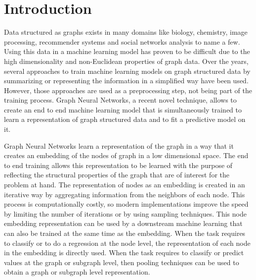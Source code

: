 \newpage
\section{Introduction}


Data structured as graphs exists in many domains like biology, chemistry, image processing, recommender systems and social networks analysis to name a few. Using this data in a machine learning model has proven to be difficult due to the high dimensionality and non-Euclidean properties of graph data. Over the years, several approaches to train machine learning models on graph structured data by summarizing or representing the information in a simplified way have been used. However, those approaches are used as a preprocessing step, not being part of the training process. Graph Neural Networks, a recent novel technique, allows to create an end to end machine learning model that is simultaneously trained to learn a representation of graph structured data and to fit a predictive model on it. 


Graph Neural Networks \cite{scarcelli} learn a representation of the graph in a way that it creates an embedding of the nodes of graph in a low dimensional space. The end to end training allows this representation to be learned with the purpose of reflecting the structural properties of the graph that are of interest for the problem at hand. The representation of nodes as an embedding is created in an iterative way by aggregating information from the neighbors of each node. This process is computationally costly, so modern implementations improve the speed by limiting the number of iterations or by using sampling techniques. 
This node embedding representation can be used by a downstream machine learning that can also be trained at the same time as the embedding. When the task requires to classify or to do a regression at the node level, the representation of each node in the embedding is directly used. When the task requires to classify or predict values at the graph or subgraph level, then pooling techniques can be used to obtain a graph or subgraph level representation.

